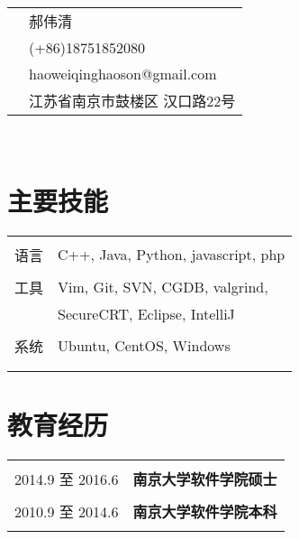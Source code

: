 \documentclass[10pt]{article} %
\begin{document}
\hfill
\begin{minipage}[t]{0.32\textwidth} %
\vspace{0pt} %

\colorbox{shade}{\textcolor{text1}{
\begin{tabular}{c|p{6cm}}
\raisebox{0pt} & 郝伟清 \\ %
\raisebox{-3pt}{\Mobilefone} &  (+86)18751852080 \\ %
\raisebox{-1pt}{\Letter} & haoweiqinghaoson@gmail.com \\ %
\raisebox{-4pt}{\textifsymbol{18}} & 江苏省南京市鼓楼区 汉口路22号 \\ %
\end{tabular}
}
}\\[10pt]



\section{主要技能} 

\begin{tabular}{rl}
& \\
语言
& C++, Java, Python, javascript, php\\
& \\
工具
& Vim, Git, SVN, CGDB, valgrind, \\
& SecureCRT, Eclipse, IntelliJ\\
& \\
系统
& Ubuntu, CentOS, Windows\\
& \\ \\
\end{tabular}

\section{教育经历} 

\begin{tabular}{rl}
& \\
2014.9 至 2016.6  & \textbf{南京大学软件学院硕士}\\
& \\
2010.9 至 2014.6  & \textbf{南京大学软件学院本科}\\ 
& \\
\end{tabular}\\[10pt]


\end{minipage}
\end{document}
